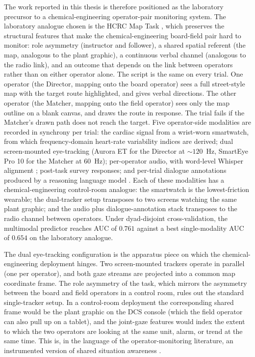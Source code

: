 The work reported in this thesis is therefore positioned as the laboratory precursor to a chemical-engineering operator-pair monitoring system. The laboratory analogue chosen is the HCRC Map Task \cite{anderson1991hcrc,carletta1996hcrc}, which preserves the structural features that make the chemical-engineering board-field pair hard to monitor: role asymmetry (instructor and follower), a shared spatial referent (the map, analogous to the plant graphic), a continuous verbal channel (analogous to the radio link), and an outcome that depends on the link between operators rather than on either operator alone. The script is the same on every trial. One operator (the Director, mapping onto the board operator) sees a full street-style map with the target route highlighted, and gives verbal directions. The other operator (the Matcher, mapping onto the field operator) sees only the map outline on a blank canvas, and draws the route in response. The trial fails if the Matcher's drawn path does not reach the target. Five operator-side modalities are recorded in synchrony per trial: the cardiac signal from a wrist-worn smartwatch, from which frequency-domain heart-rate variability indices are derived; dual screen-mounted eye-tracking (Aurora ET for the Director at $\sim$$120$~Hz, SmartEye Pro 10 for the Matcher at $60$~Hz); per-operator audio, with word-level Whisper alignment \cite{radford2023whisper}; post-task survey responses; and per-trial dialogue annotations produced by a reasoning language model \cite{openai2025gpt5}. Each of these modalities has a chemical-engineering control-room analogue: the smartwatch is the lowest-friction wearable; the dual-tracker setup transposes to two screens watching the same plant graphic; and the audio plus dialogue-annotation stack transposes to the radio channel between operators. Under dyad-disjoint cross-validation, the multimodal predictor reaches AUC of $0.761$ against a best single-modality AUC of $0.654$ on the laboratory analogue.

The dual eye-tracking configuration is the apparatus piece on which the chemical-engineering deployment hinges. Two screen-mounted trackers operate in parallel (one per operator), and both gaze streams are projected into a common map coordinate frame. The role asymmetry of the task, which mirrors the asymmetry between the board and field operators in a control room, rules out the standard single-tracker setup. In a control-room deployment the corresponding shared frame would be the plant graphic on the DCS console (which the field operator can also pull up on a tablet), and the joint-gaze features would index the extent to which the two operators are looking at the same unit, alarm, or trend at the same time. This is, in the language of the operator-monitoring literature, an instrumented version of shared situation awareness \cite{endsley1995toward,salmon2008what,stanton2017state}.

